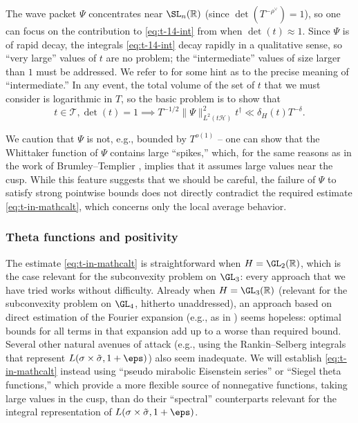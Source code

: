 The wave packet $\Psi$ concentrates near $\SL_n(\mathbb{R})$ (since $\det(T^{-\rho^\vee}) = 1$), so one can focus on the contribution to \eqref{eq:t-14-int} from when $\det(t) \approx 1$.  Since $\Psi$ is of rapid decay, the integrals \eqref{eq:t-14-int} decay rapidly in a qualitative sense, so ``very large'' values of $t$ are no problem; the ``intermediate'' values of size larger than $1$ must be addressed.  We refer to \cite[\S1.2]{MR4093914} for some hint as to the precise meaning of ``intermediate.''  In any event, the total volume of the set of $t$ that we must consider is logarithmic in $T$, so the basic problem is to show that
\begin{equation}\label{eq:t-in-mathcalt}
  t \in \mathcal{T},
  \det(t) = 1
  \implies
  T^{-1/2}
  \|\Psi \|_{L^2(t \mathcal{H})}^2
  t^\dagger  \ll
  \delta_H(t)
  T^{-\delta}.
\end{equation}

\begin{remark}
  We caution that $\Psi$ is not, e.g., bounded by $T^{o(1)}$ -- one can show that the Whittaker function of $\Psi$ contains large ``spikes,'' which, for the same reasons as in the work of Brumley--Templier \cite{MR4150475}, implies that it assumes large values near the cusp.  While this feature suggests that we should be careful, the failure of $\Psi$ to satisfy strong pointwise bounds does not directly contradict the required estimate \eqref{eq:t-in-mathcalt}, which concerns only the local average behavior.
\end{remark}


\subsubsection{Theta functions and positivity}\label{sec:theta-funct-posit}
The estimate \eqref{eq:t-in-mathcalt} is straightforward when $H = \GL_2(\mathbb{R})$, which is the case relevant for the subconvexity problem on $\GL_3$: every approach that we have tried works without difficulty.  Already when $H = \GL_3(\mathbb{R})$ (relevant for the subconvexity problem on $\GL_4$, hitherto unaddressed), an approach based on direct estimation of the Fourier expansion (e.g., as in \cite{MR3905609}) seems hopeless: optimal bounds for all terms in that expansion add up to a worse than required bound.  Several other natural avenues of attack (e.g., using the Rankin--Selberg integrals that represent $L(\sigma \times \tilde{\sigma}, 1+ \eps)$) also seem inadequate.  We will establish \eqref{eq:t-in-mathcalt} instead using ``pseudo mirabolic Eisenstein series'' or ``Siegel theta functions,'' which provide a more flexible source of nonnegative functions, taking large values in the cusp, than do their ``spectral'' counterparts relevant for the integral representation of $L(\sigma \times \tilde{\sigma}, 1 + \eps)$.

